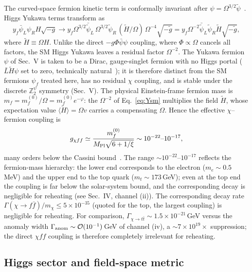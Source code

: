\documentclass[pdflatex,sn-mathphys-num]{sn-jnl}
\newcommand{\MP}{M_{\rm Pl}}
\newcommand{\Ztwo}{\mathbb{Z}_2}
\newcommand{\Ztwopsi}{\Ztwo^{\psi}}
\theoremstyle{thmstyleone}
\begin{document}
The curved-space fermion kinetic term is conformally invariant after $\psi=\Omega^{3/2}\tilde\psi$~\cite{BirrellDavies}. Higgs Yukawa terms transform as
\begin{equation}
y_f\bar\psi_L\psi_R H\sqrt{-g}\longrightarrow
y_f\Omega^{3/2}\bar{\tilde\psi}_L\,\Omega^{3/2}\tilde\psi_R\,(\tilde H/\Omega)\,\Omega^{-4}\sqrt{-\tilde g}
=y_f\Omega^{-2}\bar{\tilde\psi}_L\tilde\psi_R\tilde H\sqrt{-\tilde g},
\label{eq:Ysm}
\end{equation}
where $\tilde H\equiv\Omega H$. Unlike the direct $-g\Phi\bar\psi\psi$ coupling, where $\Phi\propto\Omega$ cancels all factors, the SM Higgs Yukawa leaves a residual factor $\Omega^{-2}$. The Yukawa fermion $\psi$ of Sec.~V is taken to be a Dirac, gauge-singlet fermion with no Higgs portal ($\bar L\tilde H\psi$ set to zero, technically natural~\cite{tHooft1980}); it is therefore distinct from the SM fermions $\psi_f$ treated here, has no residual $\chi$ coupling, and is stable under the discrete $\Ztwopsi$ symmetry (Sec.~V). The physical Einstein-frame fermion mass is $m_f=m_f^{(0)}/\Omega=m_f^{(0)}e^{-\varphi}$: the $\Omega^{-2}$ of Eq.~\eqref{eq:Ysm} multiplies the field $\tilde H$, whose expectation value $\langle\tilde H\rangle=\Omega v$ carries a compensating $\Omega$. Hence the effective $\chi$--fermion coupling is
\begin{equation}
g_{\chi ff}\simeq\frac{m_f^{(0)}}{\MP\sqrt{6+1/\xi}}\sim10^{-22}\text{--}10^{-17},
\label{eq:gchiff}
\end{equation}
many orders below the Cassini bound~\cite{Bertotti2003}. The range $\sim10^{-22}$--$10^{-17}$ reflects the fermion-mass hierarchy: the lower end corresponds to the electron ($m_e\sim0.5\,$MeV) and the upper end to the top quark ($m_t\sim173\,$GeV); even at the top end the coupling is far below the solar-system bound, and the corresponding decay is negligible for reheating (see Sec.~IV, channel (ii)). The corresponding decay rate $\Gamma(\chi\to f\bar f)/m_\chi\leq5\times10^{-35}$ (quoted for the top, the largest coupling) is negligible for reheating. For comparison, $\Gamma_{\chi\to t\bar t}\sim1.5\times10^{-21}\,$GeV versus the anomaly width $\Gamma_{\rm anom}\sim\mathcal{O}(10^{-1})\,$GeV of channel (iv), a $\sim7\times10^{19}\times$ suppression; the direct $\chi ff$ coupling is therefore completely irrelevant for reheating.

\subsection{Higgs sector and field-space metric}
\end{document}
